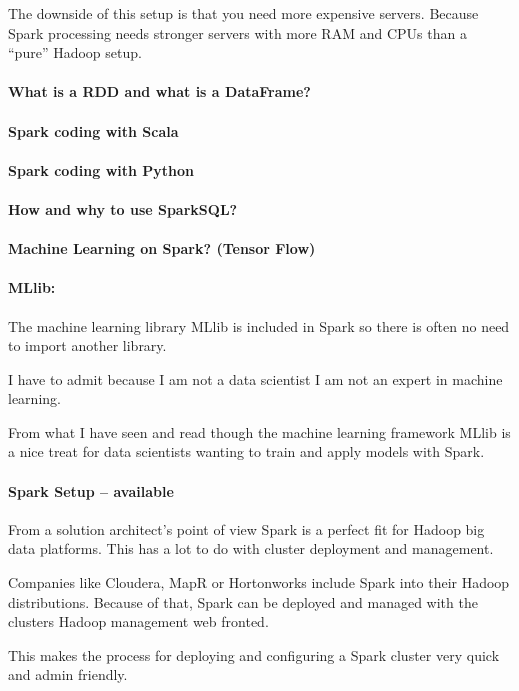 \documentclass[12pt]{scrartcl} %
\begin{document}
The downside of this setup is that you need more expensive servers. Because Spark processing needs stronger servers with more RAM and CPUs than a “pure” Hadoop setup.


\paragraph{What is a RDD and what is a DataFrame?}
\paragraph{Spark coding with Scala}
\paragraph{Spark coding with Python}
\paragraph{How and why to use SparkSQL?}
\paragraph{Machine Learning on Spark? (Tensor Flow)}

\paragraph{MLlib:} The machine learning library MLlib is included in Spark so there is often no need to import another library.

I have to admit because I am not a data scientist I am not an expert in machine learning.

From what I have seen and read though the machine learning framework MLlib is a nice treat for data scientists wanting to train and apply models with Spark.

\paragraph{Spark Setup -- available}
From a solution architect’s point of view Spark is a perfect fit for Hadoop big data platforms. This has a lot to do with cluster deployment and management.

Companies like Cloudera, MapR or Hortonworks include Spark into their Hadoop distributions. Because of that, Spark can be deployed and managed with the clusters Hadoop management web fronted.

This makes the process for deploying and configuring a Spark cluster very quick and admin friendly.
\end{document}
